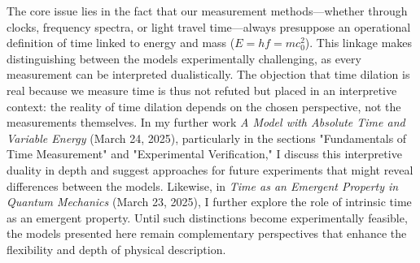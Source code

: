\documentclass[a4paper,12pt]{article}
\begin{document}
	The core issue lies in the fact that our measurement methods—whether through clocks, frequency spectra, or light travel time—always presuppose an operational definition of time linked to energy and mass (\( E = h f = m c_0^2 \)). This linkage makes distinguishing between the models experimentally challenging, as every measurement can be interpreted dualistically. The objection that time dilation is real because we measure time is thus not refuted but placed in an interpretive context: the reality of time dilation depends on the chosen perspective, not the measurements themselves. In my further work \textit{A Model with Absolute Time and Variable Energy} (March 24, 2025), particularly in the sections "Fundamentals of Time Measurement" and "Experimental Verification," I discuss this interpretive duality in depth and suggest approaches for future experiments that might reveal differences between the models. Likewise, in \textit{Time as an Emergent Property in Quantum Mechanics} (March 23, 2025), I further explore the role of intrinsic time as an emergent property. Until such distinctions become experimentally feasible, the models presented here remain complementary perspectives that enhance the flexibility and depth of physical description.
	
\end{document}
